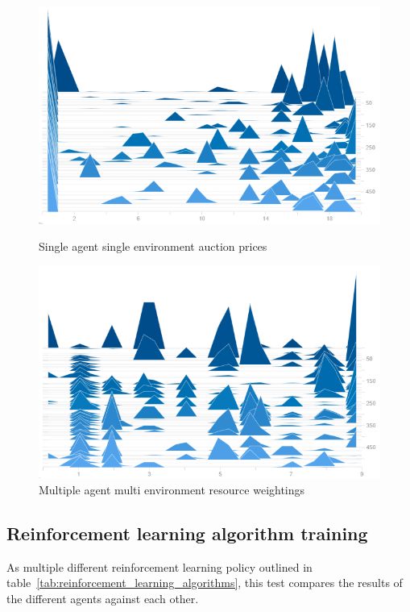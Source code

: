 \begin{figure}[h]
    \centering
    \begin{minipage}{0.5\textwidth}
        \centering
        \includegraphics[width=1.0\textwidth]{figures/4_test_eval_figs/env_training_fig/single_agent_single_env_auction_price.png}
        \caption{Single agent single environment auction prices}
        \label{fig:single_agent_single_env_auction_prices}
    \end{minipage}\hfill
    \begin{minipage}{0.5\textwidth}
        \centering
        \includegraphics[width=1.0\textwidth]{figures/4_test_eval_figs/env_training_fig/single_agent_single_env_weightings.png}
        \caption{Multiple agent multi environment resource weightings}
        \label{fig:single_agent_single_env_resource_weightings}
    \end{minipage}
\end{figure}

\subsection{Reinforcement learning algorithm training}\label{subsec:reinforcement-learning-algorithm-training}
As multiple different reinforcement learning policy outlined in table~\ref{tab:reinforcement_learning_algorithms},
this test compares the results of the different agents against each other.

